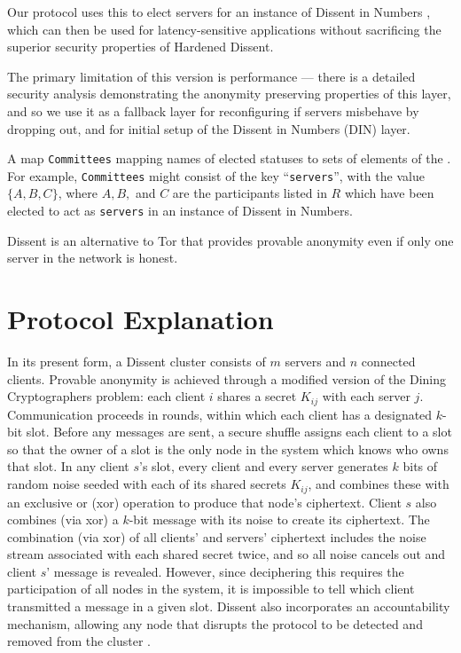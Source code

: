 Our protocol uses this to elect servers for an instance of Dissent in
Numbers \cite{din}, which can then be used for latency-sensitive applications
without sacrificing the superior security properties of Hardened Dissent.

The primary limitation of this
version is performance --- there is a detailed security analysis demonstrating
the anonymity preserving properties of this layer, and so we use it as a
fallback layer for reconfiguring if servers misbehave by dropping out, and for
initial setup of the Dissent in Numbers (DIN) layer.

    A map \texttt{Committees} mapping names of elected statuses to sets of
      elements of the \KwRoster. For example, \texttt{Committees} might
      consist of the key ``\texttt{servers}'', with the value $\{A, B, C\}$,
      where $A, B,$ and $C$ are the participants listed in $R$ which have been
      elected to act as \texttt{servers} in an instance of Dissent in
      Numbers.

  Dissent is an alternative to Tor that provides provable anonymity even if
  only one server in the network is honest\cite{p2pd}.
  \section{Protocol Explanation}
  In its present form, a Dissent cluster consists of $m$ servers and $n$
  connected clients\cite{din}. Provable anonymity is
  achieved through a modified version of the Dining Cryptographers
  problem\cite{chaum_dining_1988}: each client $i$ shares a secret $K_{ij}$
  with each server $j$. Communication proceeds in rounds, within which each
  client has a designated $k$-bit slot.  Before any messages are sent, a
  secure shuffle\cite{neff} assigns each client to a slot so
  that the owner of a slot is the only node in the system which knows who owns
  that slot.  In any client $s$'s slot, every client and every server
  generates $k$ bits of random noise seeded with each of its shared secrets
  $K_{ij}$, and combines these with an exclusive or (xor) operation to produce
  that node's ciphertext. Client $s$ also combines (via xor) a $k$-bit message
  with its noise to create its ciphertext. The combination (via xor) of all
  clients' and servers' ciphertext includes the noise stream associated with
  each shared secret twice, and so all noise cancels out and client $s$'
  message is revealed. However, since deciphering this requires the
  participation of all nodes in the system, it is impossible to tell which
  client transmitted a message in a given slot. Dissent also incorporates an
  accountability mechanism, allowing any node that disrupts the protocol to be
  detected and removed from the cluster
  \cite{verdict}.

